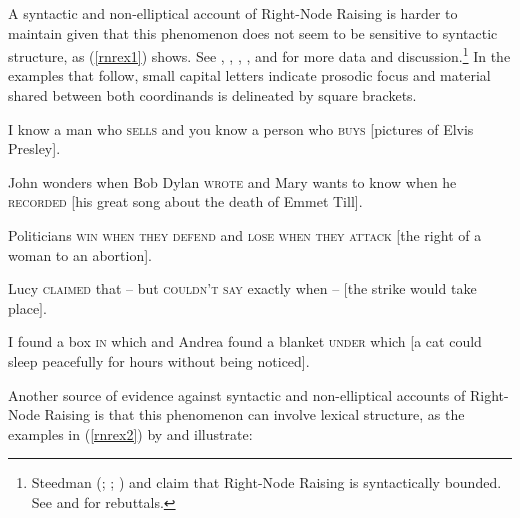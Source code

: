\eal
{}
\zl


A syntactic\label{coordination:page-rnr-start} and non-elliptical account of Right-Node Raising is harder to maintain given that this phenomenon does not seem to be sensitive to  syntactic structure, as (\ref{rnrex1}) shows. See 
\citet{bresnan74}, %
\citet[299]{wexlercull},  \citet[45]{grosu81}, \citet[--101]{mccawley}, and \citet[382, fn.\,30]{sab}
for more data and discussion.\footnote{%
  Steedman (\citeyear[]{steedman85}; \citeyear[]{gapsteed}; \citeyear[]{steedmanbook}) and
  \citet[183--184]{dowty88} claim that Right-Node Raising is syntactically bounded. See \citet[95]{phil} and \citet[]{Chaves2014a-u} for rebuttals.}
In the examples that follow, small capital letters indicate prosodic focus and material shared between both coordinands is delineated by square brackets.


\eal
\label{rnrex1}
\ex  I know a man who \textsc{sells} and you know a person who \textsc{buys}
                     [pictures of Elvis Presley].

\ex John wonders when Bob Dylan
\textsc{wrote} and Mary wants to know when
  he
\textsc{recorded} [his great song about the death of Emmet Till].
 
 \ex Politicians \textsc{win when they defend} and \textsc{lose when they attack}
[the right of a woman to an abortion].

\ex Lucy \textsc{claimed} that -- but \textsc{couldn't say}
exactly when --  $[$the strike would take place$]$.
 
 \ex I found a box \textsc{in} which and Andrea found a blanket \textsc{under}
which [a cat could sleep peacefully for hours without being
noticed].
\zl

\largerpage
Another source of evidence against syntactic and non-elliptical accounts of Right-Node
Raising is that this phenomenon can involve lexical structure, as the
examples in (\ref{rnrex2}) by \citet[1325, fn.\ 44]{rodney} and \citet{chaveslp,chavesrnr}
illustrate:

